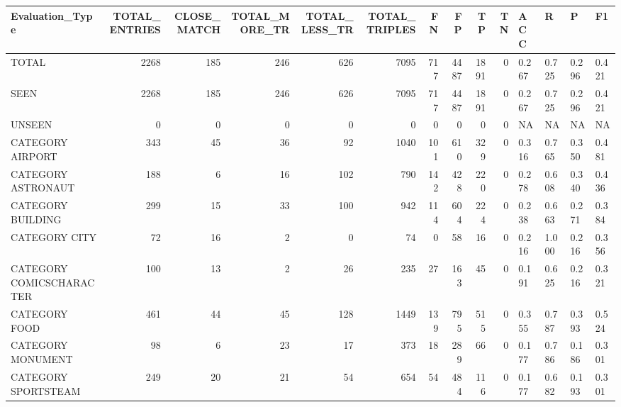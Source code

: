 \begin{tabular}{lrrrrrrrrrllll}
\hline
 Evaluation\_Type          &   TOTAL\_ENTRIES &   CLOSE\_MATCH &   TOTAL\_MORE\_TR &   TOTAL\_LESS\_TR &   TOTAL\_TRIPLES &   FN &   FP &   TP &   TN & ACC   & R     & P     & F1    \\
\hline
 TOTAL                    &            2268 &           185 &             246 &             626 &            7095 &  717 & 4487 & 1891 &    0 & 0.267 & 0.725 & 0.296 & 0.421 \\
 SEEN                     &            2268 &           185 &             246 &             626 &            7095 &  717 & 4487 & 1891 &    0 & 0.267 & 0.725 & 0.296 & 0.421 \\
 UNSEEN                   &               0 &             0 &               0 &               0 &               0 &    0 &    0 &    0 &    0 & NA    & NA    & NA    & NA    \\
 CATEGORY AIRPORT         &             343 &            45 &              36 &              92 &            1040 &  101 &  610 &  329 &    0 & 0.316 & 0.765 & 0.350 & 0.481 \\
 CATEGORY ASTRONAUT       &             188 &             6 &              16 &             102 &             790 &  142 &  428 &  220 &    0 & 0.278 & 0.608 & 0.340 & 0.436 \\
 CATEGORY BUILDING        &             299 &            15 &              33 &             100 &             942 &  114 &  604 &  224 &    0 & 0.238 & 0.663 & 0.271 & 0.384 \\
 CATEGORY CITY            &              72 &            16 &               2 &               0 &              74 &    0 &   58 &   16 &    0 & 0.216 & 1.000 & 0.216 & 0.356 \\
 CATEGORY COMICSCHARACTER &             100 &            13 &               2 &              26 &             235 &   27 &  163 &   45 &    0 & 0.191 & 0.625 & 0.216 & 0.321 \\
 CATEGORY FOOD            &             461 &            44 &              45 &             128 &            1449 &  139 &  795 &  515 &    0 & 0.355 & 0.787 & 0.393 & 0.524 \\
 CATEGORY MONUMENT        &              98 &             6 &              23 &              17 &             373 &   18 &  289 &   66 &    0 & 0.177 & 0.786 & 0.186 & 0.301 \\
 CATEGORY SPORTSTEAM      &             249 &            20 &              21 &              54 &             654 &   54 &  484 &  116 &    0 & 0.177 & 0.682 & 0.193 & 0.301 \\

\end{tabular}
